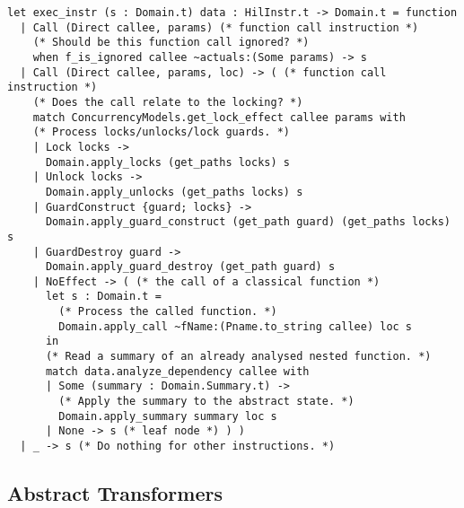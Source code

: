 \begin{lstlisting}[style=ocaml, label={list:AITransform}, float=hbt, caption={The implementation of the \emph{abstract transformers} (also called \emph{transfer functions})}]
let exec_instr (s : Domain.t) data : HilInstr.t -> Domain.t = function
  | Call (Direct callee, params) (* function call instruction *)
    (* Should be this function call ignored? *)
    when f_is_ignored callee ~actuals:(Some params) -> s
  | Call (Direct callee, params, loc) -> ( (* function call instruction *)
    (* Does the call relate to the locking? *)
    match ConcurrencyModels.get_lock_effect callee params with
    (* Process locks/unlocks/lock guards. *)
    | Lock locks ->
      Domain.apply_locks (get_paths locks) s
    | Unlock locks ->
      Domain.apply_unlocks (get_paths locks) s
    | GuardConstruct {guard; locks} ->
      Domain.apply_guard_construct (get_path guard) (get_paths locks) s
    | GuardDestroy guard ->
      Domain.apply_guard_destroy (get_path guard) s
    | NoEffect -> ( (* the call of a classical function *)
      let s : Domain.t =
        (* Process the called function. *)
        Domain.apply_call ~fName:(Pname.to_string callee) loc s
      in
      (* Read a summary of an already analysed nested function. *)
      match data.analyze_dependency callee with
      | Some (summary : Domain.Summary.t) ->
        (* Apply the summary to the abstract state. *)
        Domain.apply_summary summary loc s
      | None -> s (* leaf node *) ) )
  | _ -> s (* Do nothing for other instructions. *)
\end{lstlisting}

\subsection{Abstract Transformers}

